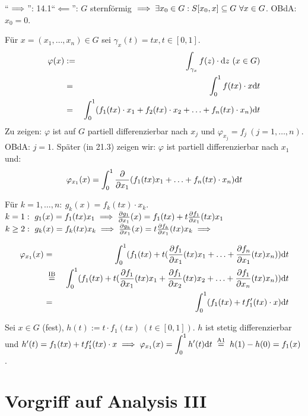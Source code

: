 \documentclass[a4paper,oneside,DIV15,BCOR12mm,chapterprefix=true,headings=onelinechapter]{scrbook}
\begin{document}
\begin{beweis}
"`$\implies$"': 14.1\quad "`$\impliedby$"': $G$ sternförmig $\implies\exists x_0\in G:S[x_0,x]\subseteq G\ \forall x\in G$. OBdA: $x_0=0$. 

Für $x=(x_1,\ldots,x_n)\in G$ sei $\gamma_x(t)=tx, t\in [0,1]$.
\begin{eqnarray*}
\varphi(x)&:=&\int_{\gamma_x}f(z)\cdot\text{d}z\ (x\in G)\\
&=&\displaystyle\int_0^1 f(tx)\cdot x\text{d}t\\
&=&\displaystyle\int_0^1(f_1(tx)\cdot x_1+f_2(tx)\cdot x_2+\ldots+f_n(tx)\cdot x_n)\text{d}t\\
\end{eqnarray*}
Zu zeigen: $\varphi$ ist auf $G$ partiell differenzierbar nach $x_j$ und $\varphi_{x_j}=f_j\ (j=1,\ldots,n)$.
OBdA: $j=1$. Später (in 21.3) zeigen wir: $\varphi$ ist partiell differenzierbar nach $x_1$ und:
$$\varphi_{x_1}(x)=\displaystyle\int_0^1\frac{\partial}{\partial x_1}(f_1(tx)x_1+\ldots+f_n(tx)\cdot x_n)\text{d}t$$

Für $k=1,\ldots,n:\ g_k(x)=f_k(tx)\cdot x_k$.\\
$k=1:\ g_1(x)=f_1(tx)x_1\implies\frac{\partial g_1}{\partial x_1}(x)=f_1(tx)+t\frac{\partial f_1}{\partial x_1}(tx)x_1$\\
$k\ge 2:\ g_k(x)=f_k(tx)x_k\folgt\frac{\partial g_k}{\partial x_1}(x)=t\frac{\partial f_k}{\partial x_1}(tx)x_k\folgt$

\begin{eqnarray*}
\varphi_{x_1}(x)&=&\int_0^1(f_1(tx)+t(\frac{\partial f_1}{\partial x_1}(tx)x_1+\ldots+\frac{\partial f_n}{\partial x_1}(tx)x_n))\text{d}t\\
&\gleichnach{IB}&\int_0^1(f_1(tx)+t(\frac{\partial f_1}{\partial x_1}(tx)x_1+\frac{\partial f_1}{\partial x_2}(tx)x_2+\ldots+\frac{\partial f_1}{\partial x_n}(tx)x_n))\text{d}t\\
&=&\ds\int_0^1(f_1(tx)+tf_1'(tx)\cdot x)\text{d}t
\end{eqnarray*}

Sei $x\in G$ (fest), $h(t):=t\cdot f_1(tx)\ (t\in [0,1])$. $h$ ist stetig differenzierbar und $h'(t)=f_1(tx)+tf_1'(tx)\cdot x\folgt \varphi_{x_1}(x)=\ds\int_0^1 h'(t)\text{d}t\gleichnach{A1}h(1)-h(0)=f_1(x)$.
\end{beweis}

\chapter{Vorgriff auf Analysis III}
\end{document}
